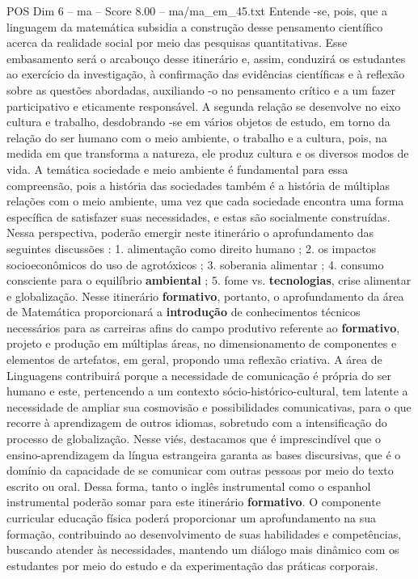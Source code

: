 \begin{textsample}{POS Dim 6 – ma – Score 8.00 – ma/ma\_em\_45.txt}
Entende -se, pois, que a linguagem da matemática subsidia a construção desse pensamento científico acerca da realidade social por meio das pesquisas quantitativas.
Esse embasamento será o arcabouço desse itinerário e, assim, conduzirá os estudantes ao exercício da investigação, à confirmação das evidências científicas e à reflexão sobre as questões abordadas, auxiliando -o no pensamento crítico e a um fazer participativo e eticamente responsável.
A segunda relação se desenvolve no eixo cultura e trabalho, desdobrando -se em vários objetos de estudo, em torno da relação do ser humano com o meio ambiente, o trabalho e a cultura, pois, na medida em que transforma a natureza, ele produz cultura e os diversos modos de vida.
A temática sociedade e meio ambiente é fundamental para essa compreensão, pois a história das sociedades também é a história de múltiplas relações com o meio ambiente, uma vez que cada sociedade encontra uma forma específica de satisfazer suas necessidades, e estas são socialmente construídas.
Nessa perspectiva, poderão emergir neste itinerário o aprofundamento das seguintes discussões : 1. alimentação como direito humano ; 2. os impactos socioeconômicos do uso de agrotóxicos ; 3. soberania alimentar ; 4. consumo consciente para o equilíbrio \textbf{ambiental} ; 5. fome vs. \textbf{tecnologias}, crise alimentar e globalização.
Nesse itinerário \textbf{formativo}, portanto, o aprofundamento da área de Matemática proporcionará a \textbf{introdução} de conhecimentos técnicos necessários para as carreiras afins do campo produtivo referente ao \textbf{formativo}, projeto e produção em múltiplas áreas, no dimensionamento de componentes e elementos de artefatos, em geral, propondo uma reflexão criativa.
A área de Linguagens contribuirá porque a necessidade de comunicação é própria do ser humano e este, pertencendo a um contexto sócio-histórico-cultural, tem latente a necessidade de ampliar sua cosmovisão e possibilidades comunicativas, para o que recorre à aprendizagem de outros idiomas, sobretudo com a intensificação do processo de globalização.
Nesse viés, destacamos que é imprescindível que o ensino-aprendizagem da língua estrangeira garanta as bases discursivas, que é o domínio da capacidade de se comunicar com outras pessoas por meio do texto escrito ou oral.
Dessa forma, tanto o inglês instrumental como o espanhol instrumental poderão somar para este itinerário \textbf{formativo}.
O componente curricular educação física poderá proporcionar um aprofundamento na sua formação, contribuindo ao desenvolvimento de suas habilidades e competências, buscando atender às necessidades, mantendo um diálogo mais dinâmico com os estudantes por meio do estudo e da experimentação das práticas corporais.

\end{textsample}
